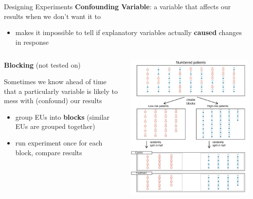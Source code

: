 \documentclass{beamer}
\begin{document}
\begin{frame}{Designing Experiments}
\textbf{Confounding Variable}: a variable that affects our results when we don't want it to
\begin{itemize}
    \item makes it impossible to tell if explanatory variables actually \textbf{caused} changes in response
\end{itemize} \vspace{4mm}

\begin{columns}
    \begin{column}{.45\textwidth}
\textbf{Blocking} (not tested on)

Sometimes we know ahead of time that a particularly variable is likely to mess with (confound) our results
\begin{itemize}
    \item group EUs into \textbf{blocks} (similar EUs are grouped together)
    \item run experiment once for each block, compare results
\end{itemize}
    \end{column}
    \begin{column}{.45\textwidth}
        \includegraphics[scale=.38]{img/blocking_example.jpg}
    \end{column}
\end{columns}

\end{frame}
\end{document}

